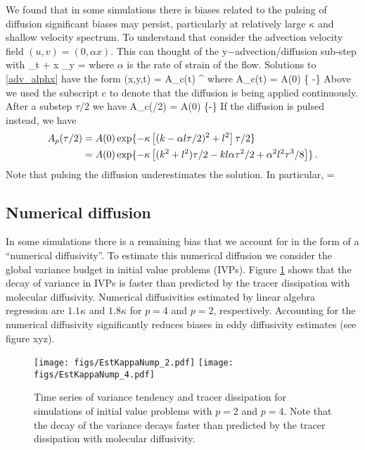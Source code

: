 \documentclass[11pt]{article}
\begin{document}
We found that in some simulations there is biases related to the pulsing of diffusion significant biases may persist, particularly at relatively large $\kappa$ and shallow velocity spectrum. To understand that consider the advection velocity field $(u,v) = (0,\alpha x)$. This can thought of the y$-$advection/diffusion sub-step with 
\beq
\label{adv_alphx}
\vth_t + \alpha x \vth_y = \kappa \lap \vth\com
\eeq
where $\alpha$ is the rate of strain of the flow. Solutions to \eqref{adv_alphx} have the form
\beq
\vth(x,y,t) = A_c(t) \ee^{\ii[(k- \alpha l t)x + l y]}\com
\eeq
where
\beq
A_c(t) = A(0) \exp\{ -\kappa{}\}\per
\eeq
Above we used the subscript c to denote that the diffusion is being applied continuously. After a
substep $\tau/2$ we have
\beq
A_c(\tau/2) = A(0) \exp\{-\kappa{}\}\per
\eeq
If the diffusion is pulsed instead, we have
\begin{align}
A_p(\tau/2) &= A(0) \exp \{ -\kappa \left[ (k - \alpha l \tau/2)^2 + l^2  \right]\tau/2\} \nonumber \\
&= A(0) \exp\{-\kappa \left[ (k^2 + l^2) \tau/2 -  k l \alpha \tau^2/2+ \alpha^2 l^2 \tau^3/8 \right] \} \, .
\end{align}
Note that pulsing the diffusion underestimates the solution. In particular,
\beq
{} =  \per
\eeq

\subsection{Numerical diffusion}
In some simulations there is a remaining bias that we account for in the form of a ``numerical diffusivity''. To estimate this numerical diffusion we consider the global variance budget in initial value problems (IVPs). Figure \ref{EstKappaNum} shows that the decay of variance in IVPs is faster than predicted by the tracer dissipation with molecular diffusivity. Numerical diffusivities  estimated by linear algebra regression are $ 1.1 \kappa$ and $1.8 \kappa$ for $p=4$ and $p=2$, respectively. Accounting for the numerical diffusivity significantly reduces biases in eddy diffusivity estimates (see figure xyz).

\begin{figure}[ht]
    \centering
    \texttt{[image: figs/EstKappaNump\_2.pdf]}
    \texttt{[image: figs/EstKappaNump\_4.pdf]}
    \caption{\small Time series of variance tendency and tracer dissipation for simulations of initial value problems with $p=2$ and $p=4$. Note that the decay of the variance decays faster than predicted by the tracer dissipation with molecular diffusivity. }
		    \label{EstKappaNum}
\end{figure}
\end{document}
